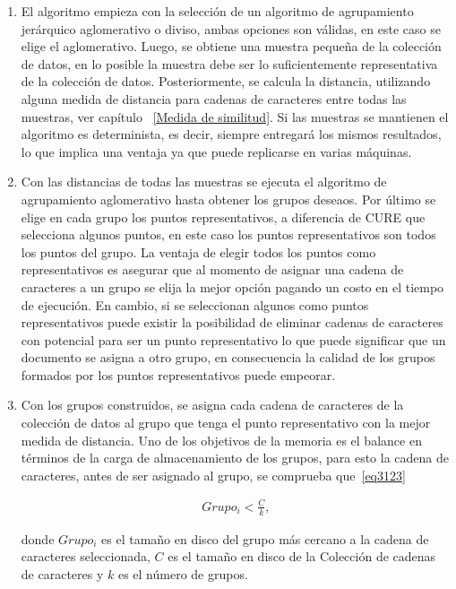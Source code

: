 \begin{enumerate}
  \item El algoritmo empieza con la selección de un algoritmo de agrupamiento jerárquico aglomerativo o diviso, ambas opciones son válidas, en este caso se elige el aglomerativo. Luego, se obtiene una muestra pequeña de la colección de datos, en lo posible la muestra debe ser lo suficientemente representativa de la colección de datos. Posteriormente, se calcula la distancia, utilizando alguna medida de distancia para cadenas de caracteres entre todas las muestras, ver capítulo ~\ref{Medida de similitud}. Si las muestras se mantienen el algoritmo es determinista, es decir, siempre entregará los mismos resultados, lo que implica una ventaja ya que puede replicarse en varias máquinas.
  
 \item \label{paso2delalg} Con las distancias de todas las muestras se  ejecuta el algoritmo de agrupamiento aglomerativo hasta obtener los grupos deseaos. Por último se elige en cada grupo los puntos representativos, a diferencia de CURE que selecciona algunos puntos, en este caso los puntos representativos son todos los puntos del grupo. La ventaja de elegir todos los puntos como representativos es asegurar que al momento de asignar una cadena de caracteres a un grupo se elija la mejor opción pagando  un costo en el tiempo de ejecución. En cambio, si se seleccionan algunos como puntos representativos puede existir la posibilidad de eliminar cadenas de caracteres con potencial para ser un punto representativo lo que puede significar que un documento se asigna a otro grupo, en consecuencia la calidad de los grupos formados por los puntos representativos puede empeorar.

  \item Con los grupos construidos, se asigna cada cadena de caracteres de la colección de datos al grupo que tenga el punto representativo  con la mejor medida de distancia. Uno de los objetivos de la memoria es el balance en términos de la carga de almacenamiento de los grupos, para esto la cadena de caracteres, antes de ser asignado al grupo, se comprueba que~\ref{eq3123}

\begin{equation}
\begin{aligned}
  Grupo_{i} < \frac{C}{k},
   \end{aligned}\label{eq3123}
\end{equation}

donde $Grupo_{i}$ es el tamaño en disco del grupo más cercano a la cadena de caracteres seleccionada, $C$ es el tamaño en disco de la Colección de cadenas de caracteres y $k$ es el número de grupos.


\end{enumerate}
